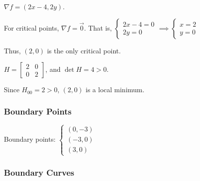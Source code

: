 $\nabla f = (2x - 4, 2y)$. 

For critical points, $\nabla f = \vec{0}$. That is, $\begin{cases} 2x - 4 = 0 \\ 2y = 0 \end{cases} \implies \begin{cases} x = 2 \\ y = 0 \end{cases}$

Thus, $(2, 0)$ is the only critical point. 

$H = \begin{bmatrix} 2 & 0 \\ 0 & 2 \end{bmatrix}$, and $\det H = 4 > 0$. 

Since $H_{00} = 2 > 0$, $(2, 0)$ is a local minimum. 

\subsubsection*{Boundary Points}

Boundary points: $\begin{cases} (0, -3) \\ (-3, 0) \\ (3, 0) \end{cases}$

\subsubsection*{Boundary Curves}

